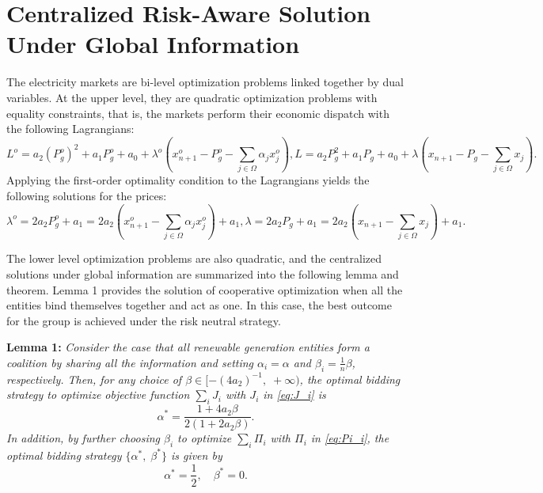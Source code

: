 \documentclass[conference]{IEEEtran}
\begin{document}
\section{Centralized Risk-Aware Solution Under Global Information}

The electricity markets are bi-level optimization problems linked together by dual variables. At the upper level, they are quadratic optimization problems with equality constraints, that is, the markets perform their economic dispatch with the following Lagrangians: 
\begin{subequations}
\begin{equation} 
L^o = a_2(P_g^o)^2+a_1P_g^o+a_0 + \lambda^o\left(x_{n+1}^o- P_g^o-\sum_{j\in\Omega} \alpha_j x_j^o \right), \label{eq:L*}
\end{equation}
\begin{equation} 
L = a_2P_g^2+a_1P_g+a_0 + \lambda\left(x_{n+1}-P_g-\sum_{j\in\Omega} x_j\right). \label{eq:L}
\end{equation}
\end{subequations}
Applying the first-order optimality condition to the Lagrangians yields the following solutions for the prices:
\begin{subequations}
\begin{equation} 
\lambda^o = 2a_2P_g^o +a_1 = 2a_2\left(x_{n+1}^o-\sum_{j\in\Omega} \alpha_j x_j^o \right) +a_1 , \label{eq:lambda*}
\end{equation}
\begin{equation} 
\lambda = 2a_2P_g+a_1=2a_2\left(x_{n+1}-\sum_{j\in\Omega} x_j \right) + a_1. \label{eq:lambda}
\end{equation}
\end{subequations}

The lower level optimization problems are also quadratic, and the centralized solutions under global information are summarized into the following lemma and theorem. Lemma 1 provides the solution of cooperative optimization when all the entities bind themselves together and act as one. In this case, the best outcome for the group is achieved under the risk neutral strategy.

\noindent \textbf{Lemma 1:} {\it Consider the case that all renewable generation entities form a coalition by sharing all the information and setting $\alpha_i=\alpha$ and $\beta_i=\frac{1}{n}\beta$, respectively. Then, for any choice of $\beta\in[-(4a_2)^{-1},\; +\infty)$, the optimal bidding strategy to optimize objective function $\sum_i J_i$ with $J_i$ in \eqref{eq:J_i} is
\begin{equation}
\alpha^* = \frac{1 + 4a_2 \beta}{2(1 + 2a_2\beta)}.
\label{eq:alpha_1}
\end{equation}
In addition, by further choosing $\beta_i$ to optimize $\sum_i \Pi_i$ with $\Pi_i$ in \eqref{eq:Pi_i}, the optimal bidding strategy $\{\alpha^*, \; \beta^*\}$ is given by}
\begin{equation}
\alpha^*  =  \frac{1}{2}, \quad
\beta^*  =  0.
\label{eq:optimal_1}
\end{equation}
\end{document}
